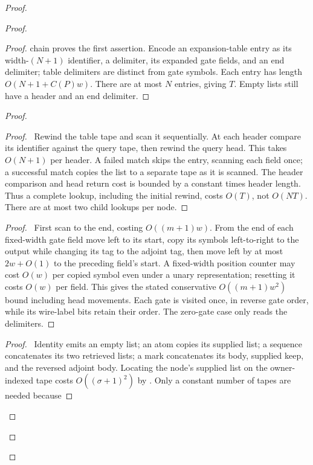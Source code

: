 \begin{proof}
\begin{proof}
\begin{proof}
  chain proves the first assertion. Encode an expansion-table entry
  as its width-$(N+1)$ identifier, a delimiter, its expanded gate
  fields, and an end delimiter; table delimiters are distinct from
  gate symbols. Each entry has length $O(N+1+C(P)w)$. There are
  at most $N$ entries, giving $T$. Empty lists still have a header
  and an end delimiter.\end{proof}
  \begin{proof}
   \begin{proof}\pf\ Rewind the table tape and scan it sequentially.
   At each header compare its identifier against the query tape, then
   rewind the query head. This takes $O(N+1)$ per header. A failed
   match skips the entry, scanning each field once; a successful match
   copies the list to a separate tape as it is scanned. The header
   comparison and head return cost is bounded by a constant times
   header length. Thus a complete lookup, including the initial rewind,
   costs $O(T)$, not $O(NT)$. There are at most two child lookups
   per node.\end{proof}
   \begin{proof}\pf\ First scan to the end, costing $O((m+1)w)$.
   From the end of each fixed-width gate field move left to its start,
   copy its symbols left-to-right to the output while changing its tag
   to the adjoint tag, then move left by at most $2w+O(1)$ to the
   preceding field's start. A fixed-width position counter may cost
   $O(w)$ per copied symbol even under a unary representation; resetting
   it costs $O(w)$ per field. This gives the stated conservative
   $O((m+1)w^2)$ bound including head movements. Each gate is visited
   once, in reverse gate order, while its wire-label bits retain their
   order. The zero-gate case only reads the delimiters.\end{proof}
   \qedstep
   \begin{proof}\pf\ Identity emits an empty list; an atom copies
   its supplied list; a sequence concatenates its two retrieved lists;
   a mark concatenates its body, supplied keep, and the reversed
   adjoint body. Locating the node's supplied list on the owner-indexed
   tape costs $O((\sigma+1)^2)$ by .
   Only a constant number of tapes are needed because

\end{proof}
\end{proof}
\end{proof}
\end{proof}
